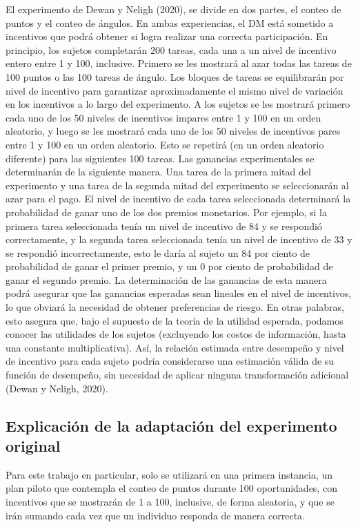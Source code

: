 \documentclass[11pt,letterpaper]{article}
\begin{document}
El experimento de Dewan y Neligh (2020), se divide en dos partes, el conteo de puntos y el conteo de ángulos. En ambas experiencias, el DM está sometido a incentivos que podrá obtener si logra realizar una correcta participación. En principio, los sujetos completarán 200 tareas, cada una a un nivel de incentivo entero entre 1 y 100, inclusive. Primero se les mostrará al azar todas las tareas de 100 puntos o las 100 tareas de ángulo. Los bloques de tareas se equilibrarán por nivel de incentivo para garantizar
aproximadamente el mismo nivel de variación en los incentivos a lo largo del experimento. A
los sujetos se les mostrará primero cada uno de los 50 niveles de incentivos impares entre 1 y
100 en un orden aleatorio, y luego se les mostrará cada uno de los 50 niveles de incentivos
pares entre 1 y 100 en un orden aleatorio. Esto se repetirá (en un orden aleatorio diferente)
para las siguientes 100 tareas.
Las ganancias experimentales se determinarán de la siguiente manera. Una tarea de la primera mitad del experimento y una tarea de la segunda mitad del experimento se seleccionarán al azar para el pago. El nivel de incentivo de cada tarea seleccionada determinará la probabilidad de ganar uno de los dos premios monetarios. Por ejemplo, si la primera tarea seleccionada tenía un nivel de incentivo de 84 y se respondió correctamente,
y la segunda tarea seleccionada tenía un nivel de incentivo de 33 y se respondió incorrectamente, esto le daría al sujeto un 84 por ciento de probabilidad de ganar el primer premio, y un 0 por ciento de probabilidad de ganar el segundo premio. La determinación de las ganancias de
esta manera podrá asegurar que las ganancias esperadas sean lineales en el nivel de incentivos, lo que obviará la necesidad de obtener preferencias de riesgo. En otras palabras, esto asegura que, bajo el supuesto de la teoría de la utilidad esperada, podamos conocer las utilidades de los sujetos (excluyendo los costos de información, hasta una constante
multiplicativa). Así, la relación estimada entre desempeño y nivel de incentivo para cada
sujeto podría considerarse una estimación válida de su función de desempeño, sin necesidad de aplicar ninguna transformación adicional (Dewan y Neligh, 2020). 

\subsection{Explicación de la adaptación del experimento original}

Para este trabajo en particular, solo se utilizará en una primera instancia, un plan piloto que contempla el conteo de puntos durante 100 oportunidades, con incentivos que se mostrarán de 1 a 100, inclusive, de forma aleatoria, y que se irán sumando cada vez que un individuo responda de manera correcta.
\end{document}

